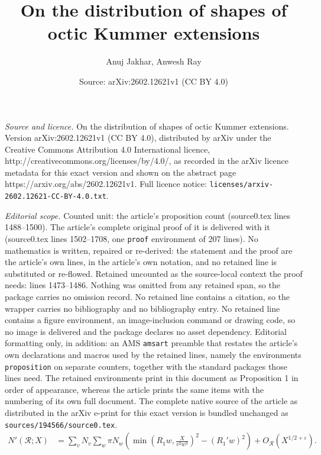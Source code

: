 \documentclass[10pt,a4paper]{amsart}
\title{On the distribution of shapes of octic Kummer extensions}
\author{Anuj Jakhar, Anwesh Ray}
\date{Source: arXiv:2602.12621v1 (CC BY 4.0)}
\begin{document}
\maketitle

\noindent\emph{Source and licence.} On the distribution of shapes of octic Kummer extensions. Version arXiv:2602.12621v1 (CC BY 4.0), distributed by arXiv under the Creative Commons Attribution 4.0 International licence, http://creativecommons.org/licenses/by/4.0/, as recorded in the arXiv licence metadata for this exact version and shown on the abstract page https://arxiv.org/abs/2602.12621v1. Full licence notice: \texttt{licenses/arxiv-2602.12621-CC-BY-4.0.txt}.\par\smallskip

\noindent\textit{Editorial scope.} Counted unit: the article's proposition count (source0.tex lines 1488--1500). The article's complete original proof of it is delivered with it (source0.tex lines 1502--1708, one \texttt{proof} environment of 207 lines). No mathematics is written, repaired or re-derived: the statement and the proof are the article's own lines, in the article's own notation, and no retained line is substituted or re-flowed.  Retained uncounted as the source-local context the proof needs: lines 1473--1486.  Nothing was omitted from any retained span, so the package carries no omission record.  No retained line contains a citation, so the wrapper carries no bibliography and no bibliography entry.  No retained line contains a figure environment, an image-inclusion command or drawing code, so no image is delivered and the package declares no asset dependency.  Editorial formatting only, in addition: an AMS \texttt{amsart} preamble that restates the article's own declarations and macros used by the retained lines, namely the environments \texttt{proposition} on separate counters, together with the standard packages those lines need.  The retained environments print in this document as Proposition 1 in order of appearance, whereas the article prints the same items with the numbering of its own full document.  The complete native source of the article as distributed in the arXiv e-print for this exact version is bundled unchanged as \texttt{sources/194566/source0.tex}.
\begin{equation}\label{eq:Nprime-sum-reduction}
\begin{aligned}
N'(\mathcal R;X)
&=
\sum_{v}N_v\sum_{w}
\pi N_w\left(
\min\!\left(R_1w,\frac{X}{v^2w^3}\right)^2
-
(R_1'w)^2
\right)
+
O_{\mathcal R}(X^{1/2+\varepsilon}).
\end{aligned}
\end{equation}
\end{document}
